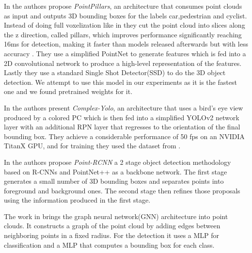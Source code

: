 \par In \cite{Lang_Vora_Caesar_Zhou_Yang_Beijbom_2019} the authors propose \emph{PointPillars}, an architecture that consumes point clouds as input and outputs 3D bounding boxes for the labels car,pedestrian and cyclist.
Instead of doing full voxelization like in \cite{zhou_voxelnet_2018} they cut the point cloud into slices along the z direction, called pillars, which improves performance significantly reaching 16ms for detection, making it faster than models released afterwards but with less accuracy \cite{Zimmer_Ercelik_Zhou_Ortiz_Knoll_2022}.
They use a simplified PointNet to generate features which is fed into a 2D convolutional network to produce a high-level representation of the features.
Lastly they use a standard Single Shot Detector(SSD) to do the 3D object detection. We attempt to use this model in our experiments as it is the fastest one and we found pretrained weights for it.

\par In \cite{Simony_Milzy_Amendey_Gross_2018} the authors present \emph{Complex-Yolo}, an architecture that uses a bird's eye view produced by a colored \ac{PC} which is then fed into a simplified YOLOv2 network layer with an additional \ac{RPN} layer that regresses to the orientation of the final bounding box.
They achieve a considerable performance of 50 fps on an NVIDIA TitanX GPU, and for training they used the dataset from \cite{geiger_are_2012}.

\par In \cite{shi_pointrcnn_2019} the authors propose \emph{Point-RCNN} a 2 stage object detection methodology based on R-CNNs and PointNet++ as a backbone network.
The first stage generates a small number of 3D bounding boxes and separates points into foreground and background ones.
The second stage then refines those proposals using the information produced in the first stage.


\par The work in \cite{shi_point-gnn_2020} brings the graph neural network(GNN) architecture into point clouds. It constructs a graph of the point cloud by adding edges between neighboring points in a fixed radius. For the detection it uses a \ac{MLP} for classification and a \ac{MLP} that computes a bounding box for each class.

